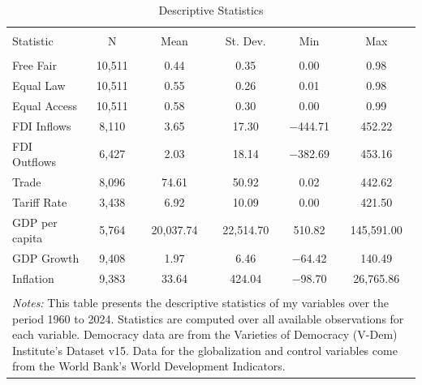 
\begin{table}[!htbp] \centering 
  \caption{Descriptive Statistics} 
  \label{} 
\begin{tabular}{@{\extracolsep{5pt}}lccccc} 
\\[-1.8ex]\hline 
\hline \\[-1.8ex] 
Statistic & \multicolumn{1}{c}{N} & \multicolumn{1}{c}{Mean} & \multicolumn{1}{c}{St. Dev.} & \multicolumn{1}{c}{Min} & \multicolumn{1}{c}{Max} \\ 
\hline \\[-1.8ex] 
Free Fair & 10,511 & 0.44 & 0.35 & 0.00 & 0.98 \\ 
Equal Law & 10,511 & 0.55 & 0.26 & 0.01 & 0.98 \\ 
Equal Access & 10,511 & 0.58 & 0.30 & 0.00 & 0.99 \\ 
FDI Inflows & 8,110 & 3.65 & 17.30 & $-$444.71 & 452.22 \\ 
FDI Outflows & 6,427 & 2.03 & 18.14 & $-$382.69 & 453.16 \\ 
Trade & 8,096 & 74.61 & 50.92 & 0.02 & 442.62 \\ 
Tariff Rate & 3,438 & 6.92 & 10.09 & 0.00 & 421.50 \\ 
GDP per capita & 5,764 & 20,037.74 & 22,514.70 & 510.82 & 145,591.00 \\ 
GDP Growth & 9,408 & 1.97 & 6.46 & $-$64.42 & 140.49 \\ 
Inflation & 9,383 & 33.64 & 424.04 & $-$98.70 & 26,765.86 \\ 
\hline \\[-1.8ex] 
\multicolumn{6}{l}{\hspace*{-\tabcolsep}\parbox{\dimexpr\textwidth+2\tabcolsep\relax}{\textit{Notes:}
                   This table presents the descriptive statistics of my
                   variables over the period 1960 to 2024. Statistics are
                   computed over all available observations for each variable.
                   Democracy data are from the Varieties of Democracy (V-Dem)
                   Institute's Dataset v15. Data for the globalization and
                   control variables come from the World Bank's World
                   Development Indicators.}} \\ 
\end{tabular} 
\end{table} 
